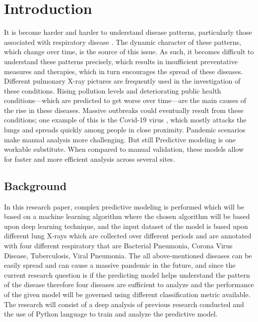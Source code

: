 \chapter{Introduction}
\label{ch:into} %

It is become harder and harder to understand disease patterns, particularly those associated with respiratory disease \cite{Zimlich}. The dynamic character of these patterns, which change over time, is the source of this issue. As such, it becomes difficult to understand these patterns precisely, which results in insufficient preventative measures and therapies, which in turn encourages the spread of these diseases. Different pulmonary X-ray pictures are frequently used in the investigation of these conditions. Rising pollution levels and deteriorating public health conditions—which are predicted to get worse over time—are the main causes of the rise in these diseases. Massive outbreaks could eventually result from these conditions; one example of this is the Covid-19 virus \cite{WHO}, which mostly attacks the lungs and spreads quickly among people in close proximity. Pandemic scenarios make manual analysis more challenging. But still Predictive modeling is one workable substitute. When compared to manual validation, these models allow for faster and more efficient analysis across several sites.



\section{Background}
\label{sec:into_back}

In this research paper, complex predictive modeling is performed which will be based on a 
machine learning algorithm where the chosen algorithm will be based upon deep learning 
technique, and the input dataset \cite{Kaggle} of the model is based upon different lung X-rays 
which are collected over different periods and are annotated with four different respiratory 
that are Bacterial Pneumonia, Corona Virus Disease, Tuberculosis, Viral 
Pneumonia. The all above-mentioned diseases can be easily spread and can cause a massive 
pandemic in the future, and since the current research question is if the predicting model 
helps understand the pattern of the disease therefore four diseases are sufficient to analyze 
and the performance of the given model will be governed using different classification metric  
\cite{sultana2021using} available. The research will consist of a deep analysis of previous research 
conducted and the use of Python language to train and analyze the predictive model.

